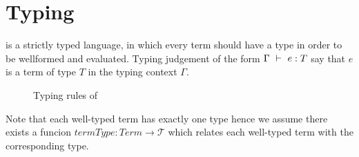 \section{Typing}
\label{sec:typing}

\langname is a strictly typed language, in which every term should have a
type in order to be wellformed and evaluated. Typing judgement of the form
$\Gamma~\vdash~e : T$ say that $e$ is a term of type $T$ in the typing
context $\Gamma$.

\begin{figure}[h]

\caption{Typing rules of \langname}
\label{fig:typing}
\end{figure}

Note that each well-typed term has exactly one type hence we assume there
exists a funcion $termType: Term \to \mathcal{T}$ which relates each well-typed
term with the corresponding type.